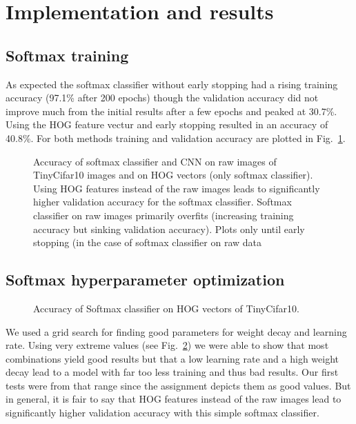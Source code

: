 \section{Implementation and results}

\subsection{Softmax training}
As expected the softmax classifier without early stopping had a rising training accuracy (97.1\% after 200 epochs) though the validation accuracy did not improve much from the initial results after a few epochs and peaked at 30.7\%. Using the HOG feature vectur and early stopping resulted in an accuracy of 40.8\%. For both methods training and validation accuracy are plotted in Fig.~\ref{fig:accuracy}.
\begin{figure}[h!t]
\newcommand{\plotref}[1]{{[~\ref{plt:#1}~]}}
\centering
\caption{Accuracy of softmax classifier and CNN on raw images of TinyCifar10 images and on HOG vectors (only softmax classifier). Using HOG features instead of the raw images leads to significantly higher validation accuracy for the softmax classifier. Softmax classifier on raw images primarily overfits (increasing training accuracy but sinking validation accuracy). Plots only until early stopping (in the case of softmax classifier on raw data  } %
\label{fig:accuracy}
\end{figure}


\subsection{Softmax hyperparameter optimization}


\begin{figure}[h!t]
\newcommand{\plotref}[1]{{[~\ref{plt:#1}~]}}
\centering
\caption{Accuracy of Softmax classifier on HOG vectors of TinyCifar10. } %
\label{figparam-opt-hog6}
\end{figure}

We used a grid search for finding good parameters for weight decay and learning rate. Using very extreme values (see Fig.~\ref{figparam-opt-hog6}) we were able to show that most combinations yield good results but that a low learning rate and a high weight decay lead to a model with far too less training and thus bad results. Our first tests were from that range since the assignment depicts them as good values. But in general, it is fair to say that HOG features instead of the raw images lead to significantly higher validation accuracy with this simple softmax classifier.

